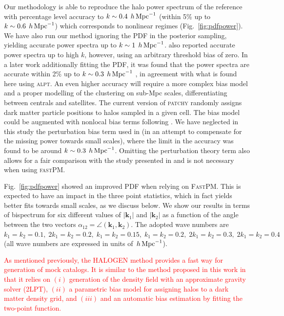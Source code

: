 \documentclass[english,usenatbib]{mn2e}
\newcommand{\tod}[1]{{\textcolor{red}{ #1}}}
\newcommand{\hperm}{\,h\,{\rm Mpc}^{-1}}
\begin{document}
Our methodology is able to reproduce the halo power spectrum of the reference with percentage level accuracy to $k \sim 0.4 \; \hperm$ (within 5\% up to $k \sim 0.6 \; \hperm$) which corresponds to  nonlinear regimes (Fig.~\ref{fig:pdfpower}). We have also run our method ignoring the PDF in the posterior sampling, yielding accurate power spectra up to $k\sim 1 \; \hperm$. \citet[][]{kitaura2014} also reported accurate power spectra up to high $k$, however, using an arbitrary threshold bias of zero. In a later work additionally fitting the PDF, it was found that the power spectra are accurate within 2\% up to $k\sim 0.3 \; \hperm$ \citep[][]{kitaura2015}, in agreement with what is found here using \textsc{alpt}. 
An even higher accuracy will require a more  complex bias model and a proper modelling of the clustering on sub-Mpc scales, differentiating between centrals and satellites. The current version of \textsc{patchy} randomly assigns dark matter particle positions to halos sampled in a given cell.
The bias model could be augmented with nonlocal bias terms following \citet[][]{mcdonald2009}. We have neglected in this study the perturbation bias term used in \citet{kitaura2016} (in an attempt to compensate for the missing power towards small scales), where the limit in the accuracy was found to be around $k\sim 0.3 \; \hperm$. Omitting the perturbation theory term also allows for a fair comparison with the study presented in \citet[][]{kitaura2015} and is not necessary when using \textsc{fastPM}. 

Fig.~\ref{fig:pdfpower} showed an improved PDF when relying on \textsc{FastPM}. This is expected to have an impact in the three point statistics, which in fact yields better fits towards small scales, as we discuss below. 
We show our results in terms of bispectrum for six different values of $|\mathbf{k}_1|$ and $|\mathbf{k}_2|$ as a function of the angle between the two vectors $\alpha_{12} = \angle (\mathbf{k}_1 , \mathbf{k}_2)$. The adopted wave numbers are $k_1=k_2=0.1,\; 2k_1=k_2=0.2,\; k_1=k_2=0.15,\; k_1=k_2=0.2,\; 2k_1=k_2=0.3,\; 2k_1=k_2=0.4$ (all wave numbers are expressed in units of $\hperm$). 

\tod{As mentioned previously, the \textsc{HALOGEN} \citealt{halogen} method provides a fast way for generation of mock catalogs. It is similar to the method proposed in this work in that it relies on $(i)$ generation of the density field with an approximate gravity solver (2LPT), $(ii)$ a parametric bias model for assigning halos to a dark matter density grid, and $(iii)$ and an automatic bias estimation by fitting the two-point function.}
\end{document}

